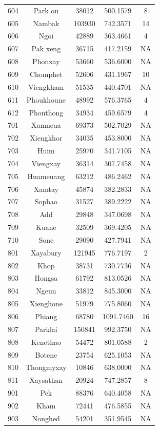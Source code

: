 \documentclass[
  letterpaper,
  DIV=11,
  numbers=noendperiod]{scrartcl}
\begin{document}
\begin{longtable}[]{@{}ccccc@{}}
604 & Park ou & 38012 & 500.1579 & 8 \\
605 & Nambak & 103930 & 742.3571 & 14 \\
606 & Ngoi & 42889 & 363.4661 & 4 \\
607 & Pak xeng & 36715 & 417.2159 & NA \\
608 & Phonxay & 53660 & 536.6000 & NA \\
609 & Chomphet & 52606 & 431.1967 & 10 \\
610 & Viengkham & 51535 & 440.4701 & NA \\
611 & Phoukhoune & 48992 & 576.3765 & 4 \\
612 & Phonthong & 34934 & 459.6579 & 4 \\
701 & Xamneua & 69373 & 502.7029 & NA \\
702 & Xiengkhor & 34035 & 453.8000 & NA \\
703 & Huim & 25970 & 341.7105 & NA \\
704 & Viengxay & 36314 & 307.7458 & NA \\
705 & Huameuang & 63212 & 486.2462 & NA \\
706 & Xamtay & 45874 & 382.2833 & NA \\
707 & Sopbao & 31527 & 389.2222 & NA \\
708 & Add & 29848 & 347.0698 & NA \\
709 & Kuane & 32509 & 369.4205 & NA \\
710 & Sone & 29090 & 427.7941 & NA \\
801 & Xayabury & 121945 & 776.7197 & 2 \\
802 & Khop & 38731 & 730.7736 & NA \\
803 & Hongsa & 61792 & 813.0526 & NA \\
804 & Ngeun & 33812 & 845.3000 & NA \\
805 & Xienghone & 51979 & 775.8060 & NA \\
806 & Phiang & 68780 & 1091.7460 & 16 \\
807 & Parklai & 150841 & 992.3750 & NA \\
808 & Kenethao & 54472 & 801.0588 & 2 \\
809 & Botene & 23754 & 625.1053 & NA \\
810 & Thongmyxay & 10846 & 638.0000 & NA \\
811 & Xaysathan & 20924 & 747.2857 & 8 \\
901 & Pek & 88376 & 640.4058 & NA \\
902 & Kham & 72441 & 476.5855 & NA \\
903 & Nonghed & 54201 & 351.9545 & NA \\

\end{longtable}
\end{document}
